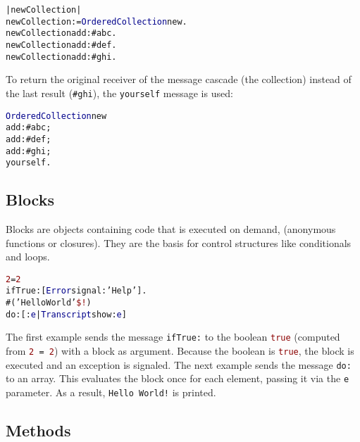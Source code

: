 \begin{alltt}
| newCollection | 
newCollection := \textcolor{darkBlue}{OrderedCollection} new.
newCollection add: \textcolor{string}{#abc}.
newCollection add: \textcolor{string}{#def}.
newCollection add: \textcolor{string}{#ghi}.
\end{alltt}


To return the original receiver of the message cascade (\ie the collection) instead of the last result (\ie \textcolor{string}{\texttt{\#ghi}}), the \texttt{yourself} message is used:

\begin{alltt}
\textcolor{darkBlue}{OrderedCollection} new
  add: \textcolor{string}{#abc};
  add: \textcolor{string}{#def};
  add: \textcolor{string}{#ghi};
  yourself.
\end{alltt}

\subsection{Blocks}

Blocks are objects containing code that is executed on demand,
(anonymous functions or closures).
They are the basis for control structures like conditionals and loops.

\begin{alltt}
\textcolor{darkRed}{2} = \textcolor{darkRed}{2}
  ifTrue: [ \textcolor{darkBlue}{Error} signal: \textcolor{string}{'Help'} ].
\#(\textcolor{string}{'Hello World'} \textcolor{darkRed}{\$!})
  do: [ :\textcolor{darkBlue}{e} | \textcolor{darkBlue}{Transcript} show: \textcolor{darkBlue}{e} ]
\end{alltt}

The first example sends the message \texttt{ifTrue:} to the boolean
\textcolor{darkRed}{\texttt{true}} (computed from \texttt{\textcolor{darkRed}{2} = \textcolor{darkRed}{2}}) with a block as argument.
Because the boolean is \textcolor{darkRed}{\texttt{true}}, the block is executed and an exception is signaled.
The next example sends the message \texttt{do:} to an array.
This evaluates the block once for each element, passing it via the \texttt{e} parameter.
As a result, \texttt{\textcolor{string}{Hello~World!}} is printed.


\subsection{Methods}

